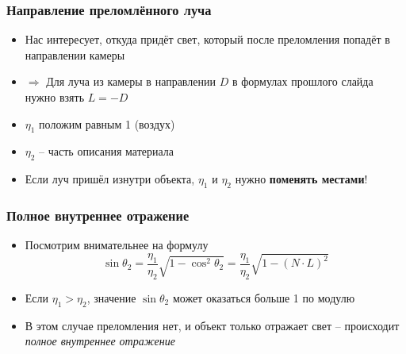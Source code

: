 \documentclass[10pt,handout]{beamer}
\begin{document}
\begin{frame}
\frametitle{Направление преломлённого луча}
\begin{itemize}
\item Нас интересует, откуда придёт свет, который после преломления попадёт в направлении камеры
\pause
\item \begin{math}\Longrightarrow\end{math} Для луча из камеры в направлении \begin{math}D\end{math} в формулах прошлого слайда нужно взять \begin{math}L = -D\end{math}
\pause
\item \begin{math}\eta_1\end{math} положим равным 1 (воздух)
\pause
\item \begin{math}\eta_2\end{math} -- часть описания материала
\pause
\item Если луч пришёл изнутри объекта, \begin{math}\eta_1\end{math} и \begin{math}\eta_2\end{math} нужно \textbf{поменять местами}!
\end{itemize}
\end{frame}

\begin{frame}
\frametitle{Полное внутреннее отражение}
\begin{itemize}
\item Посмотрим внимательнее на формулу
\begin{equation*}
\sin\theta_2 = \frac{\eta_1}{\eta_2}\sqrt{1-\cos^2\theta_2} = \frac{\eta_1}{\eta_2}\sqrt{1-(N\cdot L)^2}
\end{equation*}
\pause
\item Если \begin{math}\eta_1 > \eta_2\end{math}, значение \begin{math}\sin\theta_2\end{math} может оказаться больше 1 по модулю
\pause
\item В этом случае преломления нет, и объект только отражает свет -- происходит \textit{полное внутреннее отражение}
\end{itemize}
\end{frame}
\end{document}
